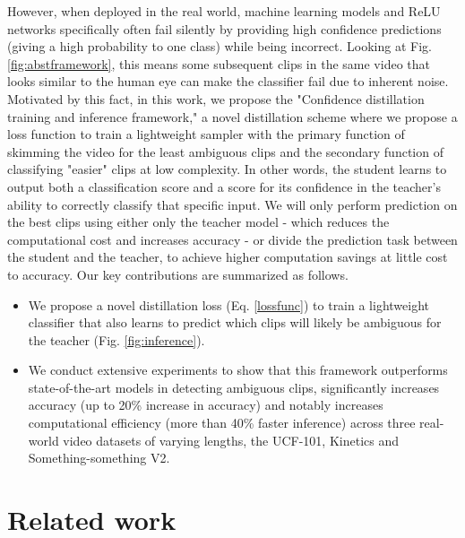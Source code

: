 \documentclass[a4paper,conference]{IEEEtran}
\begin{document}
However, when deployed in the real world, machine learning models \cite{goodfellow2014explaining, amodei2016concrete} and ReLU networks specifically \cite{hein2019relu} often fail silently by providing high confidence predictions (giving a high probability to one class) while being incorrect. Looking at Fig. \ref{fig:abstframework}, this means some subsequent clips in the same video that looks similar to the human eye can make the classifier fail due to inherent noise. Motivated by this fact, in this work, we propose the "Confidence distillation training and inference framework," a novel distillation scheme where we propose a loss function to train a lightweight sampler with the primary function of skimming the video for the least ambiguous clips and the secondary function of classifying "easier" clips at low complexity. In other words, the student learns to output both a classification score and a score  for its confidence in the teacher's ability to correctly classify that specific input. We will only perform prediction on the best  clips using either only the teacher model - which reduces the computational cost and increases accuracy - or divide the prediction task between the student and the teacher, to achieve higher computation savings at little cost to accuracy. Our key contributions are summarized as follows.

\begin{itemize}
    \item We propose a novel distillation loss (Eq. \eqref{lossfunc}) to train a lightweight classifier that also learns to predict which clips will likely be ambiguous for the teacher (Fig. \ref{fig:inference}). 
    \item We conduct extensive experiments to show that this framework outperforms state-of-the-art models in detecting ambiguous clips, significantly increases accuracy (up to 20\% increase in accuracy) and notably increases computational efficiency (more than 40\% faster inference) across three real-world video datasets of varying lengths, the UCF-101, Kinetics and Something-something V2.
\end{itemize}

\section{Related work}
\end{document}
